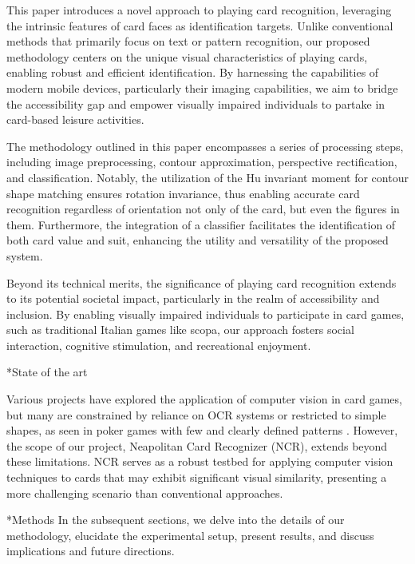 \documentclass[twocolumn, a4paper,10pt]{article}
\makeatletter
\renewcommand\section{\@startsection{section}{1}{\z@}{3pt}{3pt}{\normalfont\large\bfseries}}
\renewcommand\subsection{\@startsection{subsection}{1}{\z@}{\z@}{\z@}{\normalfont\normalsize\bfseries}}
\renewcommand\subsection{\@startsection{subsection}{1}{\z@}{\z@}{0.1pt}{\normalfont\normalsize\bfseries}}
\makeatother
\begin{document}
This paper introduces a novel approach to playing card recognition, leveraging the intrinsic features of card faces as identification targets. Unlike conventional methods that primarily focus on text or pattern recognition, our proposed methodology centers on the unique visual characteristics of playing cards, enabling robust and efficient identification. By harnessing the capabilities of modern mobile devices, particularly their imaging capabilities, we aim to bridge the accessibility gap and empower visually impaired individuals to partake in card-based leisure activities.

The methodology outlined in this paper encompasses a series of processing steps, including image preprocessing, contour approximation, perspective rectification, and classification. Notably, the utilization of the Hu invariant moment for contour shape matching ensures rotation invariance, thus enabling accurate card recognition regardless of orientation not only of the card, but even the figures in them. Furthermore, the integration of a classifier facilitates the identification of both card value and suit, enhancing the utility and versatility of the proposed system.

Beyond its technical merits, the significance of playing card recognition extends to its potential societal impact, particularly in the realm of accessibility and inclusion. By enabling visually impaired individuals to participate in card games, such as traditional Italian games like scopa, our approach fosters social interaction, cognitive stimulation, and recreational enjoyment.

\subsection*{State of the art}

Various projects have explored the application of computer vision in card games, but many are constrained by reliance on OCR systems \cite*{7972274} or restricted to simple shapes, as seen in poker games with few and clearly defined patterns \cite*{9563607}. However, the scope of our project, Neapolitan Card Recognizer (NCR), extends beyond these limitations. NCR serves as a robust testbed for applying computer vision techniques to cards that may exhibit significant visual similarity, presenting a more challenging scenario than conventional approaches.

\section*{Methods}
In the subsequent sections, we delve into the details of our methodology, elucidate the experimental setup, present results, and discuss implications and future directions.
\end{document}
